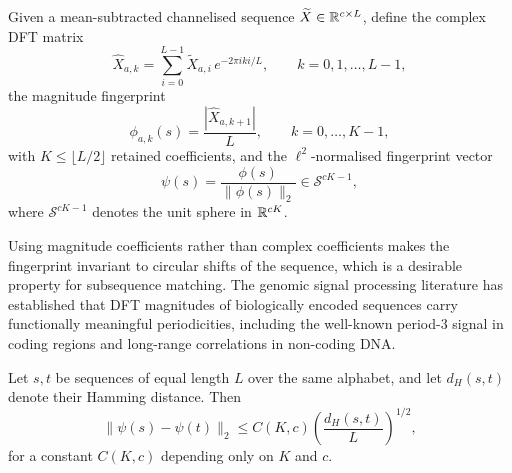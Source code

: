 \begin{definition}
\label{ps:def:fingerprint}
Given a mean-subtracted channelised sequence $\widetilde{X} \in \mathbb{R}^{c \times L}$,
define the complex DFT matrix
\begin{equation}
  \widehat{X}_{a,k} = \sum_{i=0}^{L-1} \widetilde{X}_{a,i}\, e^{-2\pi i ki/L},
  \qquad k = 0, 1, \ldots, L-1,
  \label{ps:eq:dft}
\end{equation}
the magnitude fingerprint
\begin{equation}
  \phi_{a,k}(s) = \frac{|\widehat{X}_{a,k+1}|}{L}, \qquad k = 0, \ldots, K-1,
  \label{ps:eq:magnitude}
\end{equation}
with $K \leq \lfloor L/2 \rfloor$ retained coefficients, and the
$\ell^2$-normalised fingerprint vector
\begin{equation}
  \psi(s) = \frac{\phi(s)}{\|\phi(s)\|_2} \in \mathcal{S}^{cK-1},
  \label{ps:eq:normalised_fingerprint}
\end{equation}
where $\mathcal{S}^{cK-1}$ denotes the unit sphere in $\mathbb{R}^{cK}$.
\end{definition}

Using magnitude coefficients rather than complex coefficients makes the
fingerprint invariant to circular shifts of the sequence, which is a desirable
property for subsequence matching. The genomic signal processing literature
\citep{anastassiou2001, voss1992} has established that DFT magnitudes of
biologically encoded sequences carry functionally meaningful periodicities,
including the well-known period-3 signal in coding regions and long-range
correlations in non-coding DNA.

\begin{proposition}
\label{ps:prop:lipschitz}
Let $s, t$ be sequences of equal length $L$ over the same alphabet, and let
$d_H(s, t)$ denote their Hamming distance. Then
\begin{equation}
  \|\psi(s) - \psi(t)\|_2 \leq C(K, c)\left(\frac{d_H(s,t)}{L}\right)^{1/2},
  \label{ps:eq:lipschitz}
\end{equation}
for a constant $C(K, c)$ depending only on $K$ and $c$.
\end{proposition}

